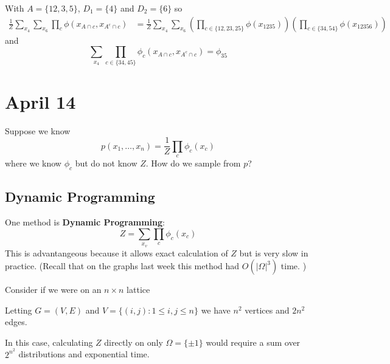 \documentclass[12pt]{report}
\newcommand{\abs}[1]{\left\vert #1 \right\vert}
\newcommand*{\tbf}[1]{\ifmmode\mathbf{#1}\else\textbf{#1}\fi}
\begin{document}
With $A = \{1 2, 3, 5\}$, $D_1 =\{4\}$ and $D_2=  \{6\}$ so
\begin{align*}
    \frac{1}{Z} \sum_{x_4} \sum_{x_6} \prod_c \phi(x_{A \cap c}, x_{A^c \cap c}) & = \frac{1}{Z} \sum_{x_4} \sum_{x_6} \left(\prod_{c \in \{12, 23, 25\}}
    \phi(x_{1235})\right) \left(\prod_{c \in \{34, 54\}} \phi(x_{12356})\right)
\end{align*}
and
\[\sum_{x_4} \prod_{c \in \{34, 45\}} \phi_c(x_{A \cap c}, x_{A^c\cap c}) = \phi_{35}\]

\section{April 14}
Suppose we know
\[p(x_1, \dots, x_n) = \frac{1}{Z} \prod_c \phi_c(x_c)\]
where we know $\phi_c$ but do not know $Z$. How do we sample from $p$?

\subsection{Dynamic Programming}
One method is \tbf{Dynamic Programming}:
\[Z = \sum_{x_v} \prod_c \phi_c(x_c)\]
This is advantangeous because it allows exact calculation of $Z$ but is very slow in practice. (Recall that on the graphs last week this method had $O(\abs{\Omega}^3)$ time. )

Consider if we were on an $n \times n$ lattice

\begin{center}
\end{center}

Letting $G = (V, E)$ and $V = \{(i, j): 1 \leq i, j \leq n\}$ we have $n^2$ vertices and $2n^2$ edges.

In this case, calculating $Z$ directly on only $\Omega = \{\pm 1\}$ would require a sum over $2^{n^2}$ distributions and exponential time.
\end{document}
